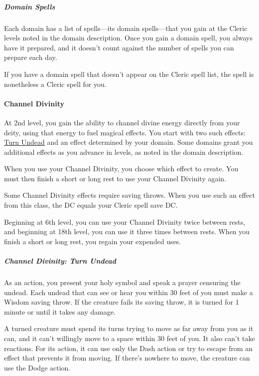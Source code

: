 \subparagraph{Domain Spells}\label{cleric-feature-divine-domain-spells}

Each domain has a list of spells---its domain spells---that you gain at
the Cleric levels noted in the domain description. Once you gain a
domain spell, you always have it prepared, and it doesn't count against
the number of spells you can prepare each day.

If you have a domain spell that doesn't appear on the Cleric spell list,
the spell is nonetheless a Cleric spell for you.

\paragraph{Channel Divinity}\label{cleric-feature-channel-divinity}

At 2nd level, you gain the ability to channel divine energy directly
from your deity, using that energy to fuel magical effects. You start
with two such effects:
\hyperref[cleric-feature-channel-divinity-turn-undead]{Turn Undead} and
an effect determined by your domain. Some domains grant you additional
effects as you advance in levels, as noted in the domain description.

When you use your Channel Divinity, you choose which effect to create.
You must then finish a short or long rest to use your Channel Divinity
again.

Some Channel Divinity effects require saving throws. When you use such
an effect from this class, the DC equals your Cleric spell save DC.

Beginning at 6th level, you can use your Channel Divinity twice between
rests, and beginning at 18th level, you can use it three times between
rests. When you finish a short or long rest, you regain your expended
uses.

\subparagraph{Channel Divinity: Turn
Undead}\label{cleric-feature-channel-divinity-turn-undead}

As an action, you present your holy symbol and speak a prayer censuring
the undead. Each undead that can see or hear you within 30 feet of you
must make a Wisdom saving throw. If the creature fails its saving throw,
it is turned for 1 minute or until it takes any damage.

A turned creature must spend its turns trying to move as far away from
you as it can, and it can't willingly move to a space within 30 feet of
you. It also can't take reactions. For its action, it can use only the
Dash action or try to escape from an effect that prevents it from
moving. If there's nowhere to move, the creature can use the Dodge
action.

